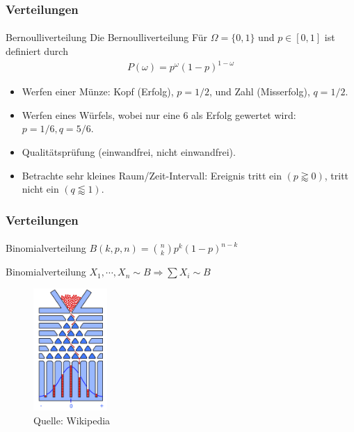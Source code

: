 \documentclass{beamer}
\begin{document}
\begin{frame}
    \frametitle{Verteilungen}
\framesubtitle{}

\begin{block}{Bernoulliverteilung}
Die Bernoulliverteilung  Für $\Omega = \{ 0, 1\}$ und $p \in [0,1]$ ist definiert durch
\begin{align*}
P (\omega) = p^{\omega} (1-p)^{1 -\omega}
\end{align*}
\end{block}

\begin{block}

\begin{itemize}
\item Werfen einer Münze: Kopf (Erfolg), $p=1/2$, und Zahl (Misserfolg), $q=1/2$.
\item Werfen eines Würfels, wobei nur eine 6 als Erfolg gewertet wird: $p=1/6, q=5/6$.
\item Qualitätsprüfung (einwandfrei, nicht einwandfrei).
\item Betrachte sehr kleines Raum/Zeit-Intervall: Ereignis tritt ein $(p \gtrapprox 0)$, tritt nicht ein $(q\lessapprox 1)$.
\end{itemize}

\end{block}
 \end{frame}




\begin{frame}
    \frametitle{ Verteilungen}
\framesubtitle{}

\begin{block}{Binomialverteilung}
$B(k,  p,n)= \binom nk p^k (1-p)^{n-k} $
\end{block}
\begin{block}{Binomialverteilung}
$X_1, \cdots ,X_n \sim B \Rightarrow \sum X_i  \sim B$
\end{block}

\begin{figure}[htp]
      \centering
    \includegraphics[width=0.25\textwidth]{img/Galton}
      \caption{Quelle: Wikipedia}
\end{figure}
 \end{frame}
\end{document}
